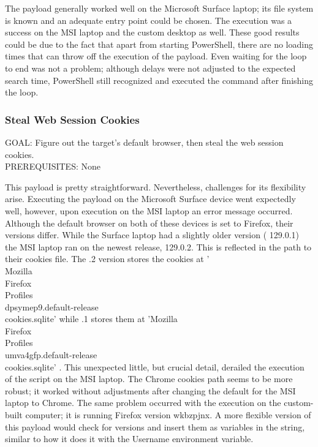 The payload generally worked well on the Microsoft Surface laptop; its file system is known and an adequate entry point could be chosen. The execution was a success on the MSI laptop and the custom desktop as well. These good results could be due to the fact that apart from starting PowerShell, there are no loading times that can throw off the execution of the payload. Even waiting for the loop to end was not a problem; although delays were not adjusted to the expected search time, PowerShell still recognized and executed the command after finishing the loop.



\subsubsection{Steal Web Session Cookies}

GOAL: Figure out the target's default browser, then steal the web session cookies. \\
PREREQUISITES: None

This payload is pretty straightforward. Nevertheless, challenges for its flexibility arise. Executing the payload on the Microsoft Surface device went expectedly well, however, upon execution on the MSI laptop an error message occurred. Although the default browser on both of these devices is set to Firefox, their versions differ. While the Surface laptop had a slightly older version ( 129.0.1) the MSI laptop ran on the newest release, 129.0.2. This is reflected in the path to their cookies file. The .2 version stores the cookies at '\\Mozilla\\Firefox\\Profiles\\dpsymep9.default-release\\cookies.sqlite'  while .1 stores them at 'Mozilla\\Firefox\\Profiles\\umva4gfp.default-release\\cookies.sqlite' . This unexpected little, but crucial detail, derailed the execution of the script on the MSI laptop. The Chrome cookies path seems to be more robust; it worked without adjustments after changing the default for the MSI laptop to Chrome. The same problem occurred with the execution on the custom-built computer; it is running Firefox version wkbzpjnx. A more flexible version of this payload would check for versions and insert them as variables in the string, similar to how it does it with the Username environment variable. 

